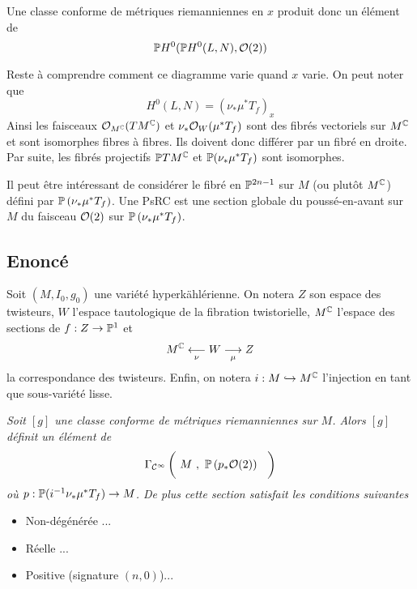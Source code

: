 \documentclass[12pt,makeidx]{amsart}
\begin{document}
Une classe conforme de métriques riemanniennes en $x$ produit donc un élément de 
\[
\mathbb{P} H^0(\mathbb{P} H^0(L,N),\mathcal{O}(2))
\]
\begin{center}
\end{center}

Reste à comprendre comment ce diagramme varie quand $x$ varie. On peut noter que 
\[
H^0(L,N) = \left( \nu_*\mu^* T_f\right)_x
\]
Ainsi les faisceaux $\mathcal{O}_{M^{\mathbb{C}}}(TM^{\mathbb{C}})$ et $\nu_*\mathcal{O}_W(\mu^* T_f)$ sont des fibrés vectoriels sur $M^{\mathbb{C}}$ et sont isomorphes fibres à fibres. Ils doivent donc différer par un fibré en droite. Par suite, les fibrés projectifs $\mathbb{P} TM^{\mathbb{C}}$ et $\mathbb{P}(\nu_*\mu^* T_f)$ sont isomorphes.

Il peut être intéressant de considérer le fibré en $\mathbb{P}^{2n-1}$ sur $M$ (ou plutôt $M^{\mathbb{C}}$) défini par $\mathbb{P} \left(\nu_*\mu^* T_f\right)$. Une PsRC est une section globale du poussé-en-avant sur $M$ du faisceau $\mathcal{O}(2)$ sur $\mathbb{P} \left(\nu_*\mu^* T_f\right)$.

\subsection*{Enoncé}Soit $(M,I_0,g_0)$ une  variété hyperkählérienne. On notera $Z$ son espace des twisteurs, $W$ l'espace tautologique de la fibration twistorielle, $M^{\mathbb{C}}$ l'espace des sections de $f : Z \to \mathbb{P}^1$ et \[M^{\mathbb{C}} \underset{\nu}{\longleftarrow} W \underset{\mu}{\longrightarrow} Z\] la correspondance des twisteurs.
Enfin, on notera $i : M \hookrightarrow M^{\mathbb{C}}$ l'injection en tant que sous-variété lisse.

{\itshape Soit $[g]$ une classe conforme de métriques riemanniennes sur $M$.
Alors $[g]$ définit un élément de 
\[
\Gamma_{\Cc^\infty}\left(\ M \ ,\ \Pro\left( p_*\Oo(2)\right) \phantom{\demi}\right)
\]
où $p : \mathbb{P}(i^{-1}\nu_*\mu^*T_f) \rightarrow M$.
De plus cette section satisfait les conditions suivantes
\begin{itemize}
\item Non-dégénérée ...
\item Réelle ...
\item Positive (signature $(n,0)$)...
\end{itemize}
}
\end{document}
